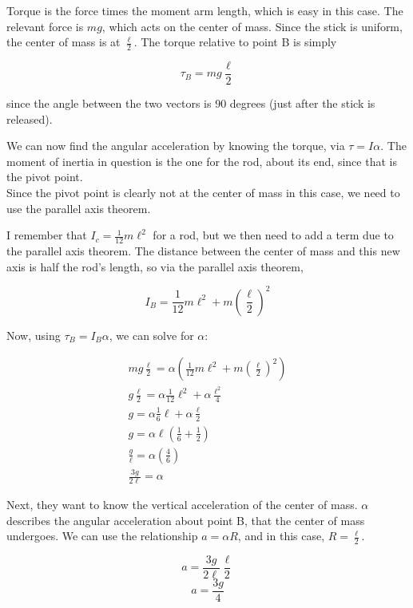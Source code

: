 \documentclass[8.01x]{subfiles}
\begin{document}
Torque is the force times the moment arm length, which is easy in this case. The relevant force is $m g$, which acts on the center of mass. Since the stick is uniform, the center of mass is at $\frac{\ell}{2}$. The torque relative to point B is simply

\begin{equation}
\tau_B = m g \frac{\ell}{2}
\end{equation}

since the angle between the two vectors is 90 degrees (just after the stick is released).

We can now find the angular acceleration by knowing the torque, via $\tau = I \alpha$. The moment of inertia in question is the one for the rod, about its end, since that is the pivot point.\\
Since the pivot point is clearly not at the center of mass in this case, we need to use the parallel axis theorem.

I remember that $I_c = \frac{1}{12} m \ell^2$ for a rod, but we then need to add a term due to the parallel axis theorem. The distance between the center of mass and this new axis is half the rod's length, so via the parallel axis theorem,

\begin{equation}
I_B = \frac{1}{12} m \ell^2 + m \left(\frac{\ell}{2}\right)^2
\end{equation}

Now, using $\tau_B = I_B \alpha$, we can solve for $\alpha$:

\begin{align}
m g \frac{\ell}{2} = \alpha\left( \frac{1}{12} m \ell^2 + m \left(\frac{\ell}{2}\right)^2 \right)\\
g \frac{\ell}{2} = \alpha \frac{1}{12} \ell^2 + \alpha \frac{\ell^2}{4}\\
g = \alpha \frac{1}{6} \ell + \alpha \frac{\ell}{2}\\
g = \alpha\ell \left( \frac{1}{6} + \frac{1}{2}\right)\\
\frac{g}{\ell} = \alpha \left( \frac{4}{6}\right)\\
\frac{3g}{2\ell} = \alpha
\end{align}

Next, they want to know the vertical acceleration of the center of mass. $\alpha$ describes the angular acceleration about point B, that the center of mass undergoes. We can use the relationship $a = \alpha R$, and in this case, $R = \frac{\ell}{2}$.

\begin{equation}
a = \frac{3g}{2\ell} \frac{\ell}{2}
\end{equation}
\begin{equation}
a = \frac{3g}{4}
\end{equation}
\end{document}
